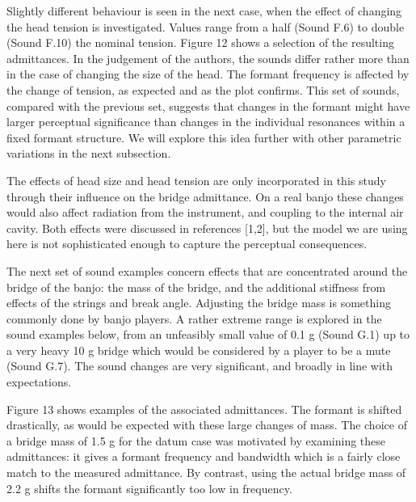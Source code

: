 
  Slightly different behaviour is seen in the next case, when the effect of 
  changing the head tension is investigated. Values range from a half (Sound 
  F.6) to double (Sound F.10) the nominal tension. Figure 12 shows a selection 
  of the resulting admittances. In the judgement of the authors, the sounds 
  differ rather more than in the case of changing the size of the head. The 
  formant frequency is affected by the change of tension, as expected and as 
  the plot confirms. This set of sounds, compared with the previous set, 
  suggests that changes in the formant might have larger perceptual 
  significance than changes in the individual resonances within a fixed formant 
  structure. We will explore this idea further with other parametric variations 
  in the next subsection. 


  The effects of head size and head tension are only incorporated in this study 
  through their influence on the bridge admittance. On a real banjo these 
  changes would also affect radiation from the instrument, and coupling to the 
  internal air cavity. Both effects were discussed in references [1,2], but the 
  model we are using here is not sophisticated enough to capture the perceptual 
  consequences. 


  The next set of sound examples concern effects that are concentrated around 
  the bridge of the banjo: the mass of the bridge, and the additional stiffness 
  from effects of the strings and break angle. Adjusting the bridge mass is 
  something commonly done by banjo players. A rather extreme range is explored 
  in the sound examples below, from an unfeasibly small value of 0.1 g (Sound 
  G.1) up to a very heavy 10 g bridge which would be considered by a player to 
  be a mute (Sound G.7). The sound changes are very significant, and broadly in 
  line with expectations. 

  Figure 13 shows examples of the associated admittances. The formant is 
  shifted drastically, as would be expected with these large changes of mass. 
  The choice of a bridge mass of 1.5 g for the datum case was motivated by 
  examining these admittances: it gives a formant frequency and bandwidth which 
  is a fairly close match to the measured admittance. By contrast, using the 
  actual bridge mass of 2.2 g shifts the formant significantly too low in 
  frequency. 

